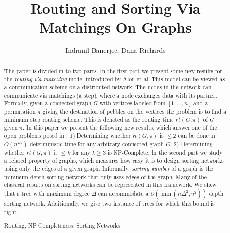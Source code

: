 \documentclass[runningheads,a4paper]{llncs}
\newcommand{\keywords}[1]{\par\addvspace\baselineskip
\noindent\keywordname\enspace\ignorespaces#1}
\begin{document}
\mainmatter  

\title{Routing and Sorting Via Matchings On Graphs}


\author{Indranil Banerjee, Dana Richards}





\maketitle


\begin{abstract}
The paper is divided in to two parts. In the first part we present some new results for the \textit{routing via matching} model introduced by Alon et al\cite{5}. This model can be viewed as a communication scheme on a distributed network. The nodes in the network can communicate via matchings (a step), where a node exchanges data with its partner. Formally, given a connected graph $G$ with vertices labeled from $[1,...,n]$ and a permutation $\pi$ giving the destination of pebbles on the vertices the problem is to find a minimum step routing scheme. This is denoted as the routing time $rt(G,\pi)$ of $G$ given $\pi$.  In this paper we present the following new results, which answer one of the open problems posed in \cite{5}: 1) Determining whether $rt(G,\pi)$ is $\le 2$ can be done in $O(n^{2.5})$ deterministic time for any arbitrary connected graph $G$. 2) Determining whether $rt(G,\pi)$ is $\le k$ for any $k \ge 3$ is NP-Complete. In the second part we study a related property of graphs, which measures how easy it is to design sorting networks using only the edges of a given graph. Informally, \textit{sorting number} of a graph is the minimum depth sorting network that only uses edges of the graph. Many of the classical results on sorting networks can be represented in this framework. We show that a tree with maximum degree $\Delta$ can accommodate a $O(\min(n\Delta^2,n^2))$ depth sorting network. Additionally, we give two instance of trees for which this bound is tight.  

\keywords{Routing, NP Completeness, Sorting Networks}
\end{abstract}
\end{document}
